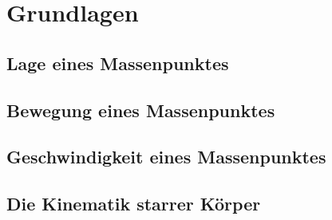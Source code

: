 \chapter{Grundlagen}
\section{Lage eines Massenpunktes}

\section{Bewegung eines Massenpunktes}

\section{Geschwindigkeit eines Massenpunktes}

\section{Die Kinematik starrer Körper}


